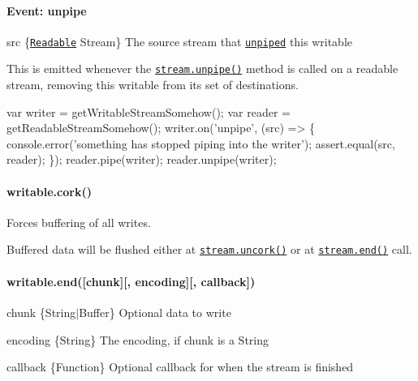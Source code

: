 \paragraph*{Event\+: \textquotesingle{}unpipe\textquotesingle{}}


\begin{DoxyItemize}
\item {\ttfamily src} \{\href{#stream_class_stream_readable}{\tt Readable} Stream\} The source stream that \href{#stream_readable_unpipe_destination}{\tt unpiped} this writable
\end{DoxyItemize}

This is emitted whenever the \href{#stream_readable_unpipe_destination}{\tt {\ttfamily stream.\+unpipe()}} method is called on a readable stream, removing this writable from its set of destinations.


\begin{DoxyCode}
var writer = getWritableStreamSomehow();
var reader = getReadableStreamSomehow();
writer.on('unpipe', (src) => \{
  console.error('something has stopped piping into the writer');
  assert.equal(src, reader);
\});
reader.pipe(writer);
reader.unpipe(writer);
\end{DoxyCode}


\paragraph*{writable.\+cork()}

Forces buffering of all writes.

Buffered data will be flushed either at \href{#stream_writable_uncork}{\tt {\ttfamily stream.\+uncork()}} or at \href{#stream_writable_end_chunk_encoding_callback}{\tt {\ttfamily stream.\+end()}} call.

\paragraph*{writable.\+end(\mbox{[}chunk\mbox{]}\mbox{[}, encoding\mbox{]}\mbox{[}, callback\mbox{]})}


\begin{DoxyItemize}
\item {\ttfamily chunk} \{String$\vert$\+Buffer\} Optional data to write
\item {\ttfamily encoding} \{String\} The encoding, if {\ttfamily chunk} is a String
\item {\ttfamily callback} \{Function\} Optional callback for when the stream is finished
\end{DoxyItemize}

